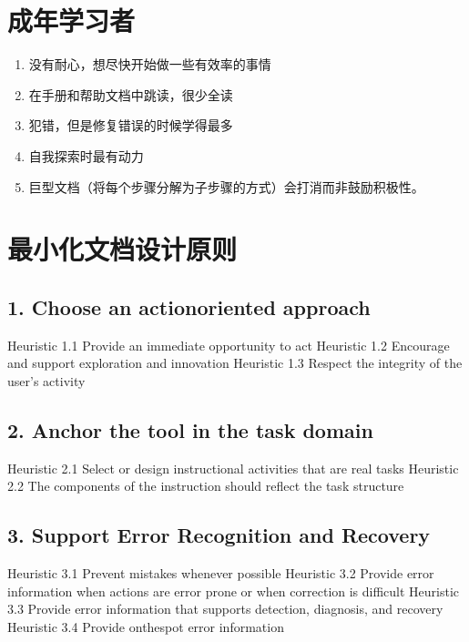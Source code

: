 \documentclass[letterpaper,10pt,english]{sphinxmanual}
\begin{document}
\section{成年学习者}
\label{\detokenize{design/minimalism:id3}}\begin{enumerate}
%
\item {} 
\sphinxAtStartPar
没有耐心，想尽快开始做一些有效率的事情

\item {} 
\sphinxAtStartPar
在手册和帮助文档中跳读，很少全读

\item {} 
\sphinxAtStartPar
犯错，但是修复错误的时候学得最多

\item {} 
\sphinxAtStartPar
自我探索时最有动力

\item {} 
\sphinxAtStartPar
巨型文档（将每个步骤分解为子步骤的方式）会打消而非鼓励积极性。

\end{enumerate}


\section{最小化文档设计原则}
\label{\detokenize{design/minimalism:id4}}

\subsection{1. Choose an action\sphinxhyphen{}oriented approach}
\label{\detokenize{design/minimalism:choose-an-action-oriented-approach}}
\sphinxAtStartPar
Heuristic 1.1 Provide an immediate opportunity to act
Heuristic 1.2 Encourage and support exploration and innovation
Heuristic 1.3 Respect the integrity of the user’s activity


\subsection{2. Anchor the tool in the task domain}
\label{\detokenize{design/minimalism:anchor-the-tool-in-the-task-domain}}
\sphinxAtStartPar
Heuristic 2.1 Select or design instructional activities that are real tasks
Heuristic 2.2 The components of the instruction should reflect the task structure


\subsection{3. Support Error Recognition and Recovery}
\label{\detokenize{design/minimalism:support-error-recognition-and-recovery}}
\sphinxAtStartPar
Heuristic 3.1 Prevent mistakes whenever possible
Heuristic 3.2 Provide error information when actions are error prone or when correction is difficult
Heuristic 3.3 Provide error information that supports detection, diagnosis, and recovery
Heuristic 3.4 Provide on\sphinxhyphen{}the\sphinxhyphen{}spot error information
\end{document}
